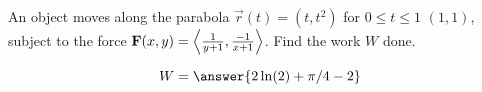 \documentclass{ximera}
\author{David Guichard \and Neal Koblitz \and H. Jerome Keisler \and Albert Scheller \and Barry Balof \and Mike Wills \and Matthew Carr}
\begin{document}
\begin{exercise}




An object moves along the parabola $\vec{r}(t)=(t,t^2)$ for $0\le t\le 1$ $(1,1)$, subject to the force $\mathbf{F}(x,y)=\left\langle \frac{1}{y+1},\frac{-1}{x+1}\right\rangle$. Find the work $W$ done.

\begin{prompt}
\[
W=\answer{2\ln(2)+\pi/4-2}
\]
\end{prompt}



\end{exercise}
\end{document}
